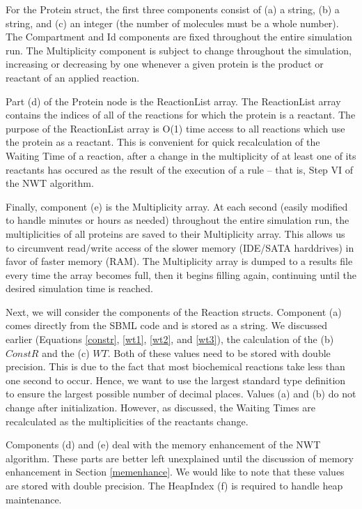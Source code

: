 \documentclass[copyright]{eptcs}
\begin{document}
For the Protein struct, the first three components consist of (a) a string, (b) a string, and (c) an integer (the number of molecules must be a whole number).  The Compartment and Id components are fixed throughout the entire simulation run.  The Multiplicity component is subject to change throughout the simulation, increasing or decreasing by one whenever a given protein is the product or reactant of an applied reaction.

Part (d) of the Protein node is the ReactionList array.  The ReactionList array contains the indices of all of the reactions for which the protein is a reactant.  The purpose of the ReactionList array is O(1) time access to all reactions which use the protein as a reactant.  This is convenient for quick recalculation of the Waiting Time of a reaction, after a change in the multiplicity of at least one of its reactants has occured as the result of the execution of a rule -- that is, Step VI of the NWT algorithm.


Finally, component (e) is the Multiplicity array.  At each second (easily modified to handle minutes or hours as needed) throughout the entire simulation run, the multiplicities of all proteins are saved to their Multiplicity array.  This allows us to circumvent read/write access of the slower memory (IDE/SATA harddrives) in favor of faster memory (RAM).  The Multiplicity array is dumped to a results file every time the array becomes full, then it begins filling again, continuing until the desired simulation time is reached.


Next, we will consider the components of the Reaction structs. Component (a) comes directly from the SBML code and is stored as a string.  We discussed earlier (Equations \ref{constr}, \ref{wt1}, \ref{wt2}, and \ref{wt3}), the calculation of the (b) $ConstR$ and the (c) $WT$.  Both of these values need to be stored with double precision.  This is due to the fact that most biochemical reactions take less than one second to occur.  Hence, we want to use the largest standard type definition to ensure the largest possible number of decimal places.  Values (a) and (b) do not change after initialization.  However, as discussed, the Waiting Times are recalculated as the multiplicities of the reactants change.

Components (d) and (e) deal with the memory enhancement of the NWT algorithm.  These parts are better left unexplained until the discussion of memory enhancement in Section \ref{memenhance}.  We would like to note that these values are stored with double precision.  The HeapIndex (f) is required to handle heap maintenance.
\end{document}
